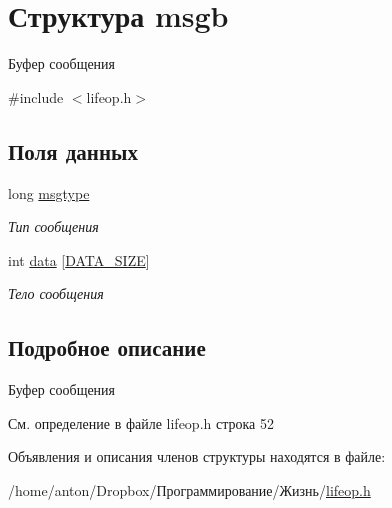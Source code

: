 \hypertarget{structmsgb}{}\section{Структура msgb}
\label{structmsgb}


Буфер сообщения  




{\ttfamily \#include $<$lifeop.\+h$>$}

\subsection*{Поля данных}
\begin{DoxyCompactItemize}
\item 
long \hyperlink{structmsgb_ac484c31c03a19ecf6c602d2beb805267}{msgtype}\hypertarget{structmsgb_ac484c31c03a19ecf6c602d2beb805267}{}\label{structmsgb_ac484c31c03a19ecf6c602d2beb805267}

\begin{DoxyCompactList}\small\item\em Тип сообщения \end{DoxyCompactList}\item 
int \hyperlink{structmsgb_adcb32367e9da1068f2e7a266f9c16f20}{data} \mbox{[}\hyperlink{lifeop_8h_adf764cbdea00d65edcd07bb9953ad2b7a7371e4160efe633ac7bbef1ce940ec83}{D\+A\+T\+A\+\_\+\+S\+I\+ZE}\mbox{]}\hypertarget{structmsgb_adcb32367e9da1068f2e7a266f9c16f20}{}\label{structmsgb_adcb32367e9da1068f2e7a266f9c16f20}

\begin{DoxyCompactList}\small\item\em Тело сообщения \end{DoxyCompactList}\end{DoxyCompactItemize}


\subsection{Подробное описание}
Буфер сообщения 

См. определение в файле lifeop.\+h строка 52



Объявления и описания членов структуры находятся в файле\+:\begin{DoxyCompactItemize}
\item 
/home/anton/\+Dropbox/Программирование/Жизнь/\hyperlink{lifeop_8h}{lifeop.\+h}\end{DoxyCompactItemize}
